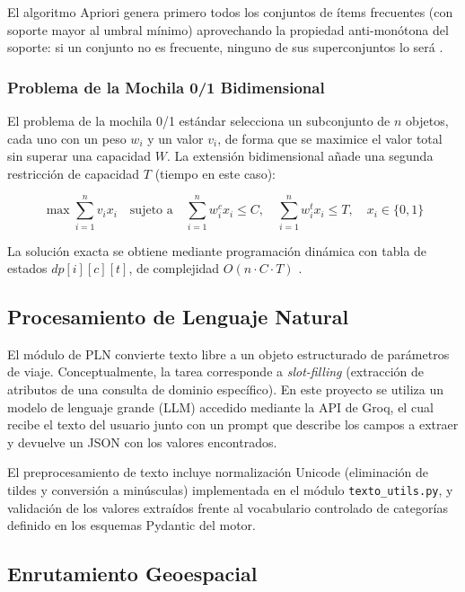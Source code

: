 \documentclass[12pt,letterpaper]{report}
\begin{document}
El algoritmo Apriori genera primero todos los conjuntos de ítems frecuentes (con soporte mayor
al umbral mínimo) aprovechando la propiedad anti-monótona del soporte: si un conjunto no es
frecuente, ninguno de sus superconjuntos lo será \cite{agrawal1994}.

\subsubsection{Problema de la Mochila 0/1 Bidimensional}

El problema de la mochila 0/1 estándar selecciona un subconjunto de $n$ objetos, cada uno con
un peso $w_i$ y un valor $v_i$, de forma que se maximice el valor total sin superar una
capacidad $W$. La extensión bidimensional añade una segunda restricción de capacidad $T$
(tiempo en este caso):

\begin{equation}
  \max \sum_{i=1}^{n} v_i x_i \quad \text{sujeto a} \quad
  \sum_{i=1}^{n} w_i^c x_i \leq C, \quad
  \sum_{i=1}^{n} w_i^t x_i \leq T, \quad
  x_i \in \{0,1\}
  \label{eq:knapsack}
\end{equation}

La solución exacta se obtiene mediante programación dinámica con tabla de estados
$dp[i][c][t]$, de complejidad $O(n \cdot C \cdot T)$ \cite{martello1990}.

\subsection{Procesamiento de Lenguaje Natural}

El módulo de PLN convierte texto libre a un objeto estructurado de parámetros de viaje.
Conceptualmente, la tarea corresponde a \textit{slot-filling} (extracción de atributos de una
consulta de dominio específico). En este proyecto se utiliza un modelo de lenguaje grande (LLM)
accedido mediante la API de Groq, el cual recibe el texto del usuario junto con un prompt que
describe los campos a extraer y devuelve un JSON con los valores encontrados.

El preprocesamiento de texto incluye normalización Unicode (eliminación de tildes y conversión
a minúsculas) implementada en el módulo \texttt{texto\_utils.py}, y validación de los valores
extraídos frente al vocabulario controlado de categorías definido en los esquemas Pydantic del
motor.

\subsection{Enrutamiento Geoespacial}
\end{document}

